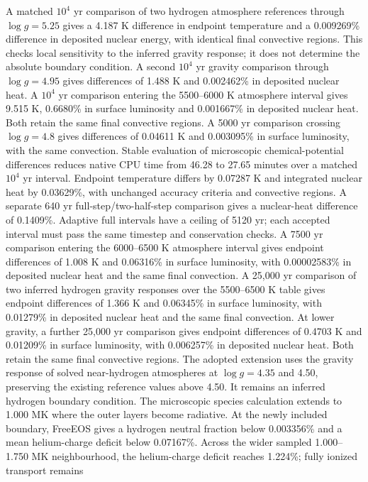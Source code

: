 \documentclass[11pt,letterpaper]{article}
\begin{document}
A matched $10^4$ yr comparison of two hydrogen atmosphere references
through $\log g=5.25$ gives a 4.187 K difference in endpoint temperature
and a 0.009269\% difference in deposited nuclear energy, with identical
final convective regions. This checks local sensitivity to the inferred
gravity response; it does not determine the absolute boundary condition.
A second $10^4$ yr gravity comparison through $\log g=4.95$
gives differences of 1.488 K and 0.002462\% in deposited nuclear heat.
A $10^4$ yr comparison entering the 5500--6000 K atmosphere interval
gives 9.515 K, 0.6680\% in surface luminosity and 0.001667\%
in deposited nuclear heat. Both retain the same final convective regions.
A 5000 yr comparison crossing $\log g=4.8$ gives differences of
0.04611 K and 0.003095\% in surface luminosity, with the same convection.
Stable evaluation of microscopic chemical-potential differences reduces
native CPU time from 46.28 to 27.65 minutes over a matched $10^4$ yr interval.
Endpoint temperature differs by 0.07287 K and integrated nuclear heat by
0.03629\%, with unchanged accuracy criteria and convective regions.
A separate 640 yr full-step/two-half-step comparison gives a nuclear-heat
difference of 0.1409\%. Adaptive full intervals have a ceiling of 5120 yr;
each accepted interval must pass the same timestep and conservation checks.
A 7500 yr comparison entering the 6000--6500 K atmosphere interval gives
endpoint differences of 1.008 K and 0.06316\% in surface luminosity, with
0.00002583\% in deposited nuclear heat and the same final convection.
A 25,000 yr comparison of two inferred hydrogen gravity responses over
the 5500--6500 K table gives endpoint differences of 1.366 K and
0.06345\% in surface luminosity, with
0.01279\% in deposited nuclear heat and the same final convection.
At lower gravity, a further 25,000 yr comparison gives endpoint differences
of 0.4703 K and 0.01209\% in surface luminosity,
with 0.006257\% in deposited nuclear heat.
Both retain the same final convective regions.
The adopted extension uses the gravity response of solved near-hydrogen
atmospheres at $\log g=4.35$ and 4.50, preserving the existing reference
values above 4.50. It remains an inferred hydrogen boundary condition.
The microscopic species calculation extends to 1.000 MK where the outer
layers become radiative. At the newly included boundary, FreeEOS gives a
hydrogen neutral fraction below 0.003356\% and a mean helium-charge deficit
below 0.07167\%. Across the wider sampled 1.000--1.750 MK neighbourhood,
the helium-charge deficit reaches 1.224\%; fully ionized transport remains
\end{document}

